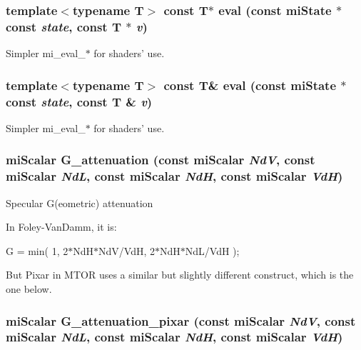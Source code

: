 \subsubsection{\setlength{\rightskip}{0pt plus 5cm}template$<$typename T$>$ const T$\ast$ eval (const mi\-State $\ast$const {\em state}, const T $\ast$ {\em v})\hspace{0.3cm}{\tt  [inline]}}\label{namespacemr_a70}


Simpler mi\_\-eval\_\-$\ast$ for shaders' use. 

\subsubsection{\setlength{\rightskip}{0pt plus 5cm}template$<$typename T$>$ const T\& eval (const mi\-State $\ast$const {\em state}, const T \& {\em v})\hspace{0.3cm}{\tt  [inline]}}\label{namespacemr_a69}


Simpler mi\_\-eval\_\-$\ast$ for shaders' use. 

\subsubsection{\setlength{\rightskip}{0pt plus 5cm}mi\-Scalar G\_\-attenuation (const mi\-Scalar {\em Nd\-V}, const mi\-Scalar {\em Nd\-L}, const mi\-Scalar {\em Nd\-H}, const mi\-Scalar {\em Vd\-H})\hspace{0.3cm}{\tt  [inline]}}\label{namespacemr_a72}


Specular G(eometric) attenuation

In Foley-Van\-Damm, it is:

G = min( 1, 2$\ast$Nd\-H$\ast$Nd\-V/Vd\-H, 2$\ast$Nd\-H$\ast$Nd\-L/Vd\-H );

But Pixar in MTOR uses a similar but slightly different construct, which is the one below. 
\subsubsection{\setlength{\rightskip}{0pt plus 5cm}mi\-Scalar G\_\-attenuation\_\-pixar (const mi\-Scalar {\em Nd\-V}, const mi\-Scalar {\em Nd\-L}, const mi\-Scalar {\em Nd\-H}, const mi\-Scalar {\em Vd\-H})\hspace{0.3cm}{\tt  [inline]}}\label{namespacemr_a73}


